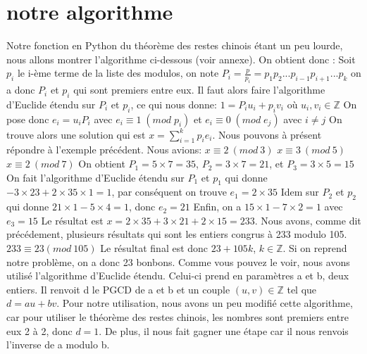 \documentclass[a4paper, 11pt]{report}
\begin{document}
\section{notre algorithme}
Notre fonction en Python du théorème des restes chinois étant un peu lourde, 
nous allons montrer l'algorithme ci-dessous (voir annexe). \newline
On obtient donc :
\newline
Soit $p_i$ le i-ème terme de la liste des modulos, on note \newline
$ P_i=\frac{p}{p_i}=p_1 p_2 ... p_{i-1} p_{i+1} ... p_k $   \newline
on a donc $P_i$ et $p_i$  qui sont premiers entre eux. \newline
Il faut alors faire l'algorithme d'Euclide étendu sur $P_i$ et $p_i$, ce qui nous donne: 
$1= P_i u_i + p_i v_i$ 
où 
$u_i, v_i \in  \mathbb{Z} $
\newline
On pose donc $e_i = u_i P_i$ avec $ e_i \equiv 1 \; (mod \; p_i)$ et $ e_i\equiv 0 \; (mod \; e_j)$ avec $ i\neq j$ \newline
On trouve alors une solution qui est $x=\sum_{i = 1}^{k}{p_i e_i} $.\newline
\newline
\newline
Nous pouvons à présent répondre à l'exemple précédent. Nous avions: \newline
$ x\equiv 2 \: (mod \:  3)$ 
\newline
$ x\equiv 3 \: (mod \: 5)$
\newline
$ x \equiv 2 \:(mod\: 7)$
\newline
On obtient $P_1=5\times 7=35$, $P_2=3\times 7=21 $, et $P_3=3\times 5=15$ \newline
On fait l'algorithme d'Euclide étendu sur $P_1$ et $p_1$ qui donne $-3\times 23 +2\times 35\times 1= 1 $, par conséquent on trouve $e_1=2\times 35$ \newline
Idem sur $P_2$ et $p_2$ qui donne $21\times 1 - 5\times 4=1$, donc $e_2=21$ \newline
Enfin, on a $15\times 1- 7\times 2 = 1 $ avec $e_3=15$ \newline
Le résultat est $x=2\times 35 + 3\times 21 + 2\times 15 =233$.
Nous avons, comme dit précédement, plusieurs résultats qui sont les entiers congrus à 233 modulo 105. \newline
$233\equiv 23 (mod \: 105)$ \newline
Le résultat final est donc $23+105k$, $k \in \mathbb{Z} $.
Si on reprend notre problème, on a donc 23 bonbons.
\newline
\newline
Comme vous pouvez le voir, nous avons utilisé l'algorithme d'Euclide étendu. Celui-ci prend en paramètres a et b, deux entiers.
Il renvoit d le PGCD de a et b et un couple $(u,v) \in \mathbb{Z} $ tel que $d=au+bv$.
\newline
Pour notre utilisation, nous avons un peu modifié cette algorithme, car pour utiliser le théorème des restes chinois, les nombres sont premiers entre eux 2 à 2,
donc $d=1$. De plus, il nous fait gagner une étape car il nous renvois l'inverse de a modulo b.
\end{document}
